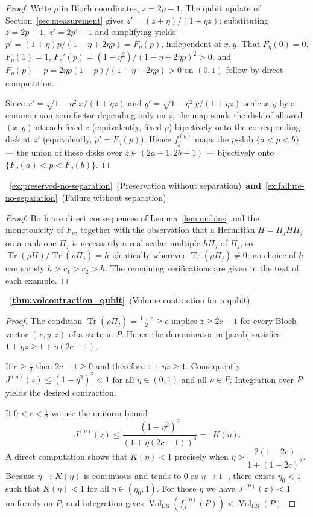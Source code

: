 \documentclass[11pt, onecolumn]{article}
\begin{document}
\begin{proof}
Write $\rho$ in Bloch coordinates, $z=2p-1$. The qubit update of Section~\ref{sec:measurement} gives $z'=(z+\eta)/(1+\eta z)$; substituting $z=2p-1$, $z'=2p'-1$ and simplifying yields $p'=(1+\eta)p/(1-\eta+2\eta p)=F_\eta(p)$, independent of $x,y$. That $F_\eta(0)=0$, $F_\eta(1)=1$, $F_\eta'(p)=(1-\eta^2)/(1-\eta+2\eta p)^2>0$, and $F_\eta(p)-p=2\eta p(1-p)/(1-\eta+2\eta p)>0$ on $(0,1)$ follow by direct computation.

Since $x'=\sqrt{1-\eta^2}\,x/(1+\eta z)$ and $y'=\sqrt{1-\eta^2}\,y/(1+\eta z)$ scale $x,y$ by a common non-zero factor depending only on $z$, the map sends the disk of allowed $(x,y)$ at each fixed $z$ (equivalently, fixed $p$) bijectively onto the corresponding disk at $z'$ (equivalently, $p'=F_\eta(p)$). Hence $f_j^{(\eta)}$ maps the $p$-slab $\{a<p<b\}$ — the union of these disks over $z\in(2a-1,2b-1)$ — bijectively onto $\{F_\eta(a)<p<F_\eta(b)\}$.
\end{proof}

~\ref{ex:preserved-no-separation}~(Preservation without separation)~{\bf and}~\ref{ex:failure-no-separation}~(Failure without separation)

\begin{proof}
Both are direct consequences of Lemma~\ref{lem:mobius} and the monotonicity of $F_\eta$, together with the observation that a Hermitian $H=\Pi_jH\Pi_j$ on a rank-one $\Pi_j$ is necessarily a real scalar multiple $h\Pi_j$ of $\Pi_j$, so $\operatorname{Tr}(\rho H)/\operatorname{Tr}(\rho\Pi_j)=h$ identically wherever $\operatorname{Tr}(\rho\Pi_j)\neq0$; no choice of $h$ can satisfy $h>c_1>c_2>h$. The remaining verifications are given in the text of each example.
\end{proof}

~{\bf \ref{thm:volcontraction_qubit}}~(Volume contraction for a qubit)

\begin{proof}
The condition \(\operatorname{Tr}(\rho\Pi_j)=\frac{1+z}{2}\ge c\) implies \(z\ge 2c-1\) for every Bloch vector
\((x,y,z)\) of a state in \(P\).  Hence the denominator in \eqref{jacob} satisfies
\(1+\eta z \ge 1+\eta(2c-1)\).

If \(c\ge\frac12\) then \(2c-1\ge0\) and therefore \(1+\eta z\ge 1\).  Consequently
\(J^{(\eta)}(z)\le(1-\eta^2)^2<1\) for all \(\eta\in(0,1)\) and all \(\rho\in P\).
Integration over \(P\) yields the desired contraction.

If \(0<c<\frac12\) we use the uniform bound
\[
J^{(\eta)}(z) \le \frac{(1-\eta^2)^2}{(1+\eta(2c-1))^4}=:K(\eta).
\]
A direct computation shows that \(K(\eta)<1\) precisely when \(\eta > \dfrac{2(1-2c)}{1+(1-2c)^2}\).
Because \(\eta\mapsto K(\eta)\) is continuous and tends to \(0\) as \(\eta\to1^-\),
there exists \(\eta_0<1\) such that \(K(\eta)<1\) for all \(\eta\in(\eta_0,1)\).
For those \(\eta\) we have \(J^{(\eta)}(z)<1\) uniformly on \(P\), and integration gives
\(\operatorname{Vol}_{\mathrm{HS}}(f_j^{(\eta)}(P))<\operatorname{Vol}_{\mathrm{HS}}(P)\).
\end{proof}
\end{document}
